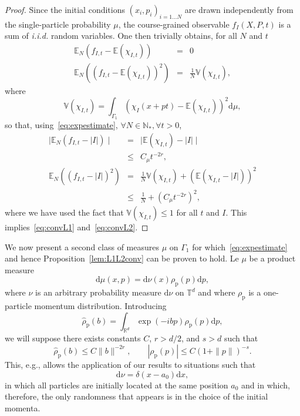 \documentclass{article}
\newcommand {\E}{\mathbb{E}}
\newcommand {\N}{\mathbb{N}}
\newcommand {\R}{\mathbb{R}}
\newcommand {\V}{\mathbb{V}}
\newcommand {\rd}{\mathrm{d}}
\newcommand {\T}{\mathbb{T}}
\numberwithin{equation}{section}
\begin{document}
\begin{proof}
Since the initial conditions $(x_i, p_i)_{i=1\dots N}$ are drawn independently from the single-particle probability $\mu$, the course-grained observable $f_I(X,P,t)$ is a sum of \emph{i.i.d.} random variables. One then trivially obtains, for all $N$ and $t$
\begin{eqnarray}
\E_N\left(f_{I,t}-\E(\chi_{I,t})\right)&=&0\nonumber\\
\E_N\left((f_{I,t}-\E(\chi_{I,t}))^2\right)&=&\frac1N\V(\chi_{I,t}),\label{eq:variance}
\end{eqnarray}
where
\begin{equation*}
\V(\chi_{I,t})=\int_{\Gamma_1} (\chi_I(x+pt) - \E(\chi_{I,t}))^{2} \rd\mu,
\end{equation*}
so that, using~\eqref{eq:expestimate}, $\forall N\in\N_*, \forall t>0$,
\begin{eqnarray}
\mid\E_N(f_{I,t}-|I|)\mid&=&\mid \E(\chi_{I,t})-|I|\mid\nonumber\\
&\leq& C_\mu t^{-2r},\label{eq:control1}\\
\E_N\left((f_{I,t}-|I|)^2\right)&=&\frac{1}{N}\V(\chi_{I,t})+\left(\E(\chi_{I,t}-|I|)\right)^2\nonumber\\
&\leq& \frac1N + \left( C_\mu t^{-2r}\right)^2,\label{eq:control2}
\end{eqnarray}
where we have used the fact that $\V(\chi_{I,t})\leq 1$ for all $t$ and $I$. This implies~\eqref{eq:convL1} and~\eqref{eq:convL2}.
\end{proof}
We now present a second class of measures $\mu$ on $\Gamma_1$ for which~\eqref{eq:expestimate} and hence Proposition~\ref{lem:L1L2conv} can be proven to hold.  Le $\mu$ be a product measure
\begin{equation}\label{eq:productmeasure}
\rd \mu(x,p)=\rd \nu(x)\rho_{\mathrm p}(p)\rd p ,
\end{equation}
where $\nu$ is an arbitrary probability measure $\rd \nu$ on $\T^d$ and where $\rho_{\mathrm{p}}$ is a one-particle momentum distribution. Introducing
$$
\hat\rho_{\mathrm{p}}(b)=\int_{\R^d}\exp(-ibp)\rho_{\mathrm{p}}(p)\rd p,
$$
we will suppose there exists constants $C$, $r>d/2$, and $s>d$ such that
\begin{equation}\label{eq:rhopcondition}
\hat\rho_{\mathrm{p}}(b)\leq C\|b\|^{-2r},\qquad |\rho_{\mathrm{p}}(p)|\leq C(1+\|p\|)^{-s}.
 \end{equation}
 This, e.g.,
allows the application of our results to situations such that
\begin{equation}\label{eq:deltacondition}
\rd \nu = \delta(x-a_0)\rd x ,
\end{equation}
in which all particles are initially located at the same position $a_0$ and in which, therefore,
the only randomness that appears is in the choice of the initial momenta.
\end{document}
